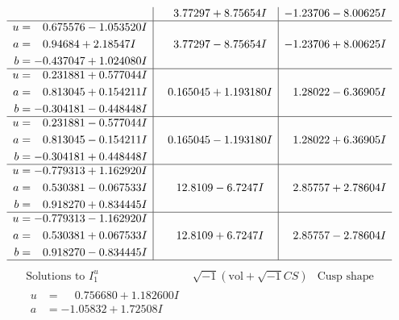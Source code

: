 \documentclass[1p]{elsarticle_modified}
\theoremstyle{definition}
\newcommand{\I}{\sqrt{-1}}
\begin{document}
$$\begin{array}{c|c|c}
 & \phantom{-}3.77297 + 8.75654 I & -1.23706 - 8.00625 I \\ \hline\begin{aligned}
u &= \phantom{-}0.675576 - 1.053520 I \\
a &= \phantom{-}0.94684 + 2.18547 I \\
b &= -0.437047 + 1.024080 I\end{aligned}
 & \phantom{-}3.77297 - 8.75654 I & -1.23706 + 8.00625 I \\ \hline\begin{aligned}
u &= \phantom{-}0.231881 + 0.577044 I \\
a &= \phantom{-}0.813045 + 0.154211 I \\
b &= -0.304181 - 0.448448 I\end{aligned}
 & \phantom{-}0.165045 + 1.193180 I & \phantom{-}1.28022 - 6.36905 I \\ \hline\begin{aligned}
u &= \phantom{-}0.231881 - 0.577044 I \\
a &= \phantom{-}0.813045 - 0.154211 I \\
b &= -0.304181 + 0.448448 I\end{aligned}
 & \phantom{-}0.165045 - 1.193180 I & \phantom{-}1.28022 + 6.36905 I \\ \hline\begin{aligned}
u &= -0.779313 + 1.162920 I \\
a &= \phantom{-}0.530381 - 0.067533 I \\
b &= \phantom{-}0.918270 + 0.834445 I\end{aligned}
 & \phantom{-}12.8109 - 6.7247 I & \phantom{-}2.85757 + 2.78604 I \\ \hline\begin{aligned}
u &= -0.779313 - 1.162920 I \\
a &= \phantom{-}0.530381 + 0.067533 I \\
b &= \phantom{-}0.918270 - 0.834445 I\end{aligned}
 & \phantom{-}12.8109 + 6.7247 I & \phantom{-}2.85757 - 2.78604 I\\
 \hline 
 \end{array}$$\newpage$$\begin{array}{c|c|c}  
\text{Solutions to }I^u_{1}& \I (\text{vol} + \sqrt{-1}CS) & \text{Cusp shape}\\
 \hline 
\begin{aligned}
u &= \phantom{-}0.756680 + 1.182600 I \\
a &= -1.05832 + 1.72508 I \\

\end{aligned}
\end{array}$$
\end{document}
